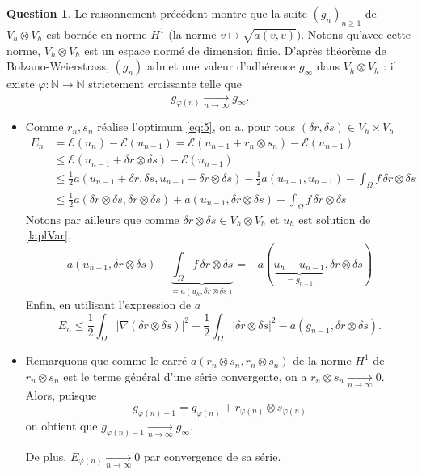 \documentclass[11pt]{article}
\theoremstyle{definition}
\newtheorem{ques}{Question}
\theoremstyle{plain}
\begin{document}
\begin{ques}
Le raisonnement précédent montre que la suite $(g_n)_{n\geq 1}$ de $V_h\otimes V_h$ est bornée en norme $H^1$ (la norme $v\longmapsto \sqrt{a(v,v)}$). Notons qu'avec cette norme, $V_h\otimes V_h$ est un espace normé de dimension finie. D'après théorème de Bolzano-Weierstrass, $(g_n)$ admet une valeur d'adhérence $g_\infty$ dans $V_h\otimes V_h$ : il existe $\varphi\colon\mathbb N\to\mathbb N$ strictement croissante telle que
\[
g_{\varphi(n)}\xrightarrow[n\to\infty]{}g_\infty.
\]


\begin{itemize}
\item Comme $r_n,s_n$ réalise l'optimum \eqref{eq:5}, on a, pour tous $(\delta r,\delta s)\in V_h\times V_h$
\begin{align*}
E_n &= 
\mathcal{E}(u_n) - \mathcal{E}(u_{n-1}) = \mathcal{E}(u_{n-1}+r_n\otimes s_n) - \mathcal{E}(u_{n-1}) \\
&\leq \mathcal E(u_{n-1} +\delta r\otimes\delta s) - \mathcal E(u_{n-1}) \\
&\leq \frac 12a(u_{n-1}+\delta r,\delta s,u_{n-1} + \delta r\otimes \delta s) - \frac 12a(u_{n-1},u_{n-1}) - \int_\Omega f\,\delta r\otimes\delta s \\
&\leq \frac 12a(\delta r\otimes\delta s,\delta r\otimes\delta s) + a(u_{n-1},\delta r\otimes\delta s) - \int_\Omega f\,\delta r\otimes\delta s
\end{align*}
Notons par ailleurs que comme $\delta r\otimes\delta s\in V_h\otimes V_h$ et $u_h$ est solution de \eqref{laplVar},
\[
a(u_{n-1},\delta r\otimes\delta s) - \underbrace{\int_\Omega f\,\delta r\otimes\delta s}_{= a(u_h,\delta r\otimes\delta s)}= -a(\underbrace{u_h-u_{n-1}}_{=g_{n-1}},\delta r\otimes\delta s)
\]
Enfin, en utilisant l'expression de $a$
\[
\boxed{E_n \leq \frac12 \int_\Omega |\nabla(\delta r\otimes\delta s)|^2 + \frac 12\int_\Omega |\delta r\otimes\delta s|^2 - a(g_{n-1},\delta r\otimes\delta s).}
\]

\item Remarquons que comme le carré $a(r_n\otimes s_n,r_n\otimes s_n)$ de la norme $H^1$ de $r_n\otimes s_n$ est le terme général d'une série convergente, on a $r_n\otimes s_n\xrightarrow[n\to\infty]{}0$. Alors, puisque
\[
g_{\varphi(n)-1} = g_{\varphi(n)} + r_{\varphi(n)}\otimes s_{\varphi(n)}
\]
on obtient que $g_{\varphi(n)-1}\xrightarrow[n\to\infty]{}g_\infty$.

De plus, $E_{\varphi(n)}\xrightarrow[n\to\infty]{}0$ par convergence de sa série.


\end{itemize}
\end{ques}
\end{document}
